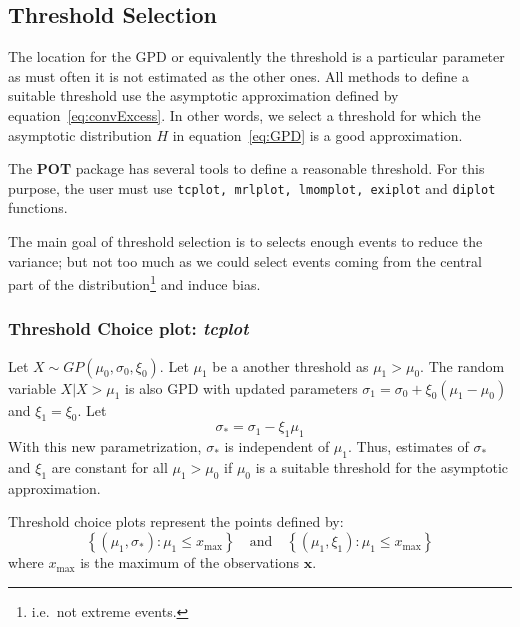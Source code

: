 \documentclass[a4paper]{article}
\numberwithin{equation}{section}
\theoremstyle{definition}
\begin{document}
\subsection{Threshold Selection}
\label{subsec:threshSelect}

The location for the GPD or equivalently the threshold is a particular
parameter as must often it is not estimated as the other ones. All
methods to define a suitable threshold use the asymptotic
approximation defined by equation~\eqref{eq:convExcess}. In other
words, we select a threshold for which the asymptotic distribution $H$
in equation~\eqref{eq:GPD} is a good approximation.

The \textbf{POT} package has several tools to define a reasonable
threshold. For this purpose, the user must use
\verb+tcplot, mrlplot, lmomplot, exiplot+ and \verb+diplot+ functions.

The main goal of threshold selection is to selects enough events to
reduce the variance; but not too much as we could select events coming
from the central part of the distribution\footnote{i.e.\ not extreme
  events.} and induce bias.

\subsubsection{Threshold Choice plot:  \emph{tcplot}}
\label{subsubsection:tcplot}

Let $X \sim GP(\mu_0, \sigma_0, \xi_0)$. Let $\mu_1$ be a another
threshold as $\mu_1 > \mu_0$. The random variable $X | X > \mu_1$ is
also GPD with updated parameters $\sigma_1 = \sigma_0 + \xi_0 ( \mu_1
- \mu_0)$ and $\xi_1 = \xi_0$.
Let
\begin{equation}
  \label{eq:reparamScale}
  \sigma_* = \sigma_1 - \xi_1 \mu_1
\end{equation}
With this new parametrization, $\sigma_*$ is independent of
$\mu_1$. Thus, estimates of $\sigma_*$ and $\xi_1$ are constant for
all $\mu_1 > \mu_0$ if $\mu_0$ is a suitable threshold for the
asymptotic approximation.

Threshold choice plots represent the points defined by:
\begin{equation}
  \label{eq:tcplot}
  \left\{\left(\mu_1, \sigma_*\right) : \mu_1 \leq x_\mathrm{max}
  \right\} \quad \text{and} \quad \left\{\left(\mu_1, \xi_1\right) :
    \mu_1 \leq x_\mathrm{max} \right\}
\end{equation}
where $x_\mathrm{max}$ is the maximum of the observations
$\mathbf{x}$.
\end{document}
